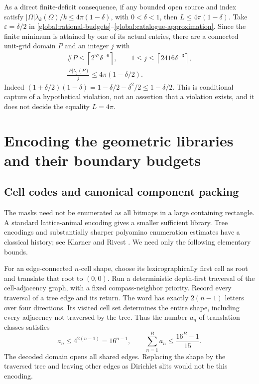 \documentclass[11pt,reqno]{amsart}
\numberwithin{equation}{section}
\newcommand{\abs}[1]{\lvert#1\rvert}
\newcommand{\Om}{\Omega}
\begin{document}
As a direct finite-deficit consequence, if any bounded open source
and index satisfy
$\abs{\Om}\lambda_k(\Om)/k\leq4\pi(1-\delta)$, with
$0<\delta<1$, then $L\leq4\pi(1-\delta)$.  Take
$\varepsilon=\delta/2$ in
\eqref{global:rational-budgets}--\eqref{global:catalogue-approximation}.
Since the finite minimum is attained by one of its actual entries,
there are a connected unit-grid domain $P$ and an integer $j$ with
\begin{equation}
 \begin{gathered}
 \#P\leq\left\lceil2^{52}\delta^{-6}\right\rceil,
 \qquad
 1\leq j\leq\left\lceil2416\delta^{-3}\right\rceil,\\
 \frac{\abs P\lambda_j(P)}j\leq4\pi(1-\delta/2).
 \end{gathered}
 \label{global:finite-deficit-capture}
\end{equation}
Indeed
$(1+\delta/2)(1-\delta)=1-\delta/2-\delta^2/2
 \leq1-\delta/2$.
This is conditional capture of a hypothetical violation, not an
assertion that a violation exists, and it does not decide the
equality $L=4\pi$.

\section{Encoding the geometric libraries and their boundary budgets}
\label{sec:encoding}\label{boundary:section}

\subsection{Cell codes and canonical component packing}

The masks need not be enumerated as all bitmaps in a large
containing rectangle. A standard lattice-animal encoding gives a
smaller sufficient library. Tree encodings and substantially sharper
polyomino enumeration estimates have a classical history; see
Klarner and Rivest \cite{KlarnerRivest1973}. We need only the
following elementary bounds.

For an edge-connected $n$-cell shape, choose its lexicographically
first cell as root and translate that root to $(0,0)$. Run a
deterministic depth-first traversal of the cell-adjacency graph,
with a fixed compass-neighbor priority. Record every traversal of
a tree edge and its return. The word has exactly $2(n-1)$ letters
over four directions. Its visited cell set determines the entire
shape, including every adjacency not traversed by the tree.
Thus the number $a_n$ of translation classes satisfies
\[
 a_n\le4^{2(n-1)}=16^{n-1},\qquad
 \sum_{n=1}^B a_n\le\frac{16^B-1}{15}.
\]
The decoded domain opens all shared edges. Replacing the shape by
the traversed tree and leaving other edges as Dirichlet slits
would not be this encoding.
\end{document}
